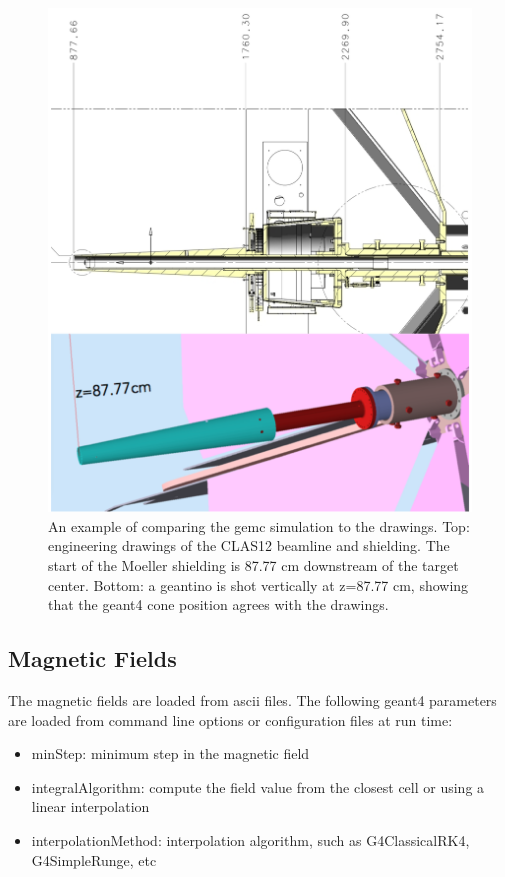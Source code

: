 \begin{figure}
	\centering
	\includegraphics[width=0.95\columnwidth,keepaspectratio]{img/cadValidationExample.png}
	\caption{An example of comparing the gemc simulation to the drawings. Top: engineering drawings of
             the CLAS12 beamline and shielding. The start of the Moeller shielding is 87.77 cm downstream
             of the target center. Bottom: a geantino is shot vertically at z=87.77 cm, showing that the
             geant4 cone position agrees with the drawings.}
	\label{fig:cadValidationExample}
\end{figure}



\subsection{Magnetic Fields}
The magnetic fields are loaded from ascii files. The following geant4 parameters are loaded from
command line options or configuration files at run time:

\begin{itemize}
	\item minStep: minimum step in the magnetic field
	\item integralAlgorithm: compute the field value from the closest cell or using a linear interpolation
	\item interpolationMethod: interpolation algorithm, such as G4ClassicalRK4, G4SimpleRunge, etc
\end{itemize}

